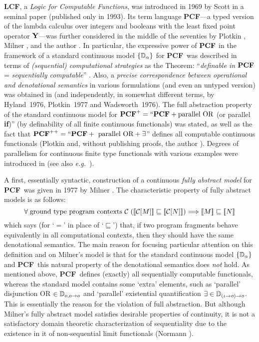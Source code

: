 \documentclass[fleqn]{LMCS}
\theoremstyle{plain}\newtheorem{satz}[thm]{Satz}
\theoremstyle{plain}\newtheorem{hyp}[thm]{Hypothesis}
\theoremstyle{plain}\newtheorem{hyps}[thm]{Hypotheses}
\theoremstyle{definition}\newtheorem{note}[thm]{Note}
\def\eg{{\em e.g.}}
\newcommand{\setof}[1]{\{#1\}}
\newcommand{\arr}{\rightarrow}
\newcommand{\Arrr}{\Longrightarrow}
\newcommand{\Dsem}[1]{[\![ #1 ]\!]}
\newcommand{\PCF}{\mbox{\bf PCF}}
\newcommand{\LCF}{\mbox{\bf LCF}}
\newcommand{\Y}{\mbox{\bf Y}}
\newcommand{\IF}{\mbox{\bf if}}
\newcommand{\CC}{{\mathcal C}}
\newcommand{\fla}[1]{$#1$}
\newcommand{\sqle}{\sqsubseteq}
\newcommand{\?}{\mbox{?}}
\begin{document}
\noindent
\LCF, a \emph{Logic for Computable Functions}, 
was introduced in 1969 by Scott 
in a seminal paper \cite{Scott93} (published only in 1993). 
Its term language \PCF---a typed version of the lambda calculus 
over integers and booleans with the 
least fixed point operator \fla{\Y}---was further considered in the middle 
of the seventies by Plotkin \cite{Plotkin77}, 
Milner \cite{Milner77}, and the author 
\cite{Saz76d,Saz76AL,Saz76SMZH,Saz76t}. 
In particular, the expressive power of \fla{\PCF} in the framework 
of a standard continuous model $\setof{\bbD_{\alpha}}$ 
for \PCF\ was described 
in terms of 
\emph{(sequential) computational strategies} 
as the Theorem:  
``\emph{definable in \fla{\PCF}} = 
\emph{sequentially computable}'' \cite{Saz76AL}. 
Also, a 
\emph{precise correspondence between operational 
and denotational semantics}  
in various formulations (and even an untyped version) 
was 
obtained in \cite{Saz76SMZH} (and independently, 
in somewhat different terms, by Hyland~1976, 
Plotkin~1977 and Wadsworth~1976). 
The full abstraction property of the standard continuous model for 
$\PCF^+=\textrm{``}\PCF+\mbox{parallel OR}$ (or parallel \IF)''
(by definability of all finite continuous functionals) 
was stated, as well as the fact that 
\fla{\PCF^{++}=\textrm{``}\PCF+\mbox{ parallel OR}+\exists}'' 
defines  
all computable 
continuous functionals (Plotkin \cite{Plotkin77} and, 
without publishing proofs, 
the author \cite{Saz76d,Saz76AL}).
Degrees of parallelism for continuous 
finite type functionals with various examples 
were introduced in \cite{Saz76d} 
(see also \eg\ \cite{Bucciarelli97Degrees,MTrakhte76TCS}). 

A first, essentially syntactic, construction of 
a continuous \emph{fully abstract model} for \PCF\ 
was given in 1977 by Milner 
\cite{Milner77}. The characteristic property of fully abstract models 
is as follows: \[
\forall\; {\rm ground\ type\ program\ contexts\ } 
\CC\;(\Dsem{\CC[M]}\sqle\Dsem{\CC[N]})\Arrr\Dsem{M}\sqle\Dsem{N}
\]
which says (for `$=$' in place of `$\sqle$') that, if two program fragments 
behave equivalently in all computational contexts, then they 
should have the same denotational semantics. The main reason for focusing 
particular attention on this definition and on Milner's model 
is that for the standard continuous 
model  $\setof{\bbD_{\alpha}}$ and \PCF\ this natural property 
of the denotational 
semantics does \emph{not} hold. As mentioned above, \PCF\ defines 
(exactly) all sequentially computable functionals, whereas the 
standard model contains some `extra' elements, such as 
`parallel' disjunction OR $\in \bbD_{o,o\arr o}$ and 
`parallel' existential quantification 
$\exists\in \bbD_{(\iota\arr o)\arr o}$. This is essentially the reason 
for the violation of full abstraction. 
But although Milner's fully abstract model 
satisfies desirable properties of continuity, 
it is not a satisfactory domain theoretic characterization of sequentiality 
due to the existence in it of non-sequential 
limit functionals (Normann \cite{Normann2004}). 
\end{document}
